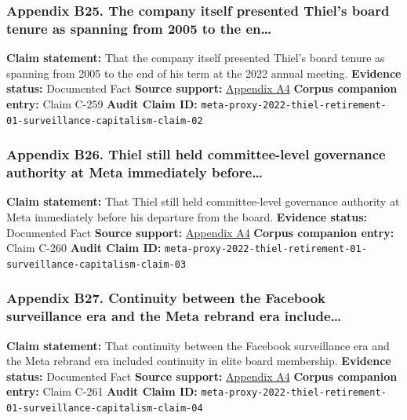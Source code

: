 \documentclass[
  american,
  11pt,
  letterpaper,
]{article}
\begin{document}
\subsubsection{Appendix B25. The company itself presented Thiel's board
tenure as spanning from 2005 to the
en\ldots{}}\label{ch-01-appendix-b25-the-company-itself-presented-thiel-s-board-tenure-as-spanning-from-2005-to-the-en}

\textbf{Claim statement:} That the company itself presented Thiel's
board tenure as spanning from 2005 to the end of his term at the 2022
annual meeting. \textbf{Evidence status:} Documented Fact \textbf{Source
support:}
\hyperref[ch-01-appendix-a4-meta-platforms-inc-2022-definitive-proxy-statement]{Appendix
A4} \textbf{Corpus companion entry:} Claim C-259 \textbf{Audit Claim
ID:}
\texttt{meta-proxy-2022-thiel-retirement-01-surveillance-capitalism-claim-02}

\subsubsection{Appendix B26. Thiel still held committee-level governance
authority at Meta immediately
before\ldots{}}\label{ch-01-appendix-b26-thiel-still-held-committee-level-governance-authority-at-meta-immediately-before}

\textbf{Claim statement:} That Thiel still held committee-level
governance authority at Meta immediately before his departure from the
board. \textbf{Evidence status:} Documented Fact \textbf{Source
support:}
\hyperref[ch-01-appendix-a4-meta-platforms-inc-2022-definitive-proxy-statement]{Appendix
A4} \textbf{Corpus companion entry:} Claim C-260 \textbf{Audit Claim
ID:}
\texttt{meta-proxy-2022-thiel-retirement-01-surveillance-capitalism-claim-03}

\subsubsection{Appendix B27. Continuity between the Facebook
surveillance era and the Meta rebrand era
include\ldots{}}\label{ch-01-appendix-b27-continuity-between-the-facebook-surveillance-era-and-the-meta-rebrand-era-include}

\textbf{Claim statement:} That continuity between the Facebook
surveillance era and the Meta rebrand era included continuity in elite
board membership. \textbf{Evidence status:} Documented Fact
\textbf{Source support:}
\hyperref[ch-01-appendix-a4-meta-platforms-inc-2022-definitive-proxy-statement]{Appendix
A4} \textbf{Corpus companion entry:} Claim C-261 \textbf{Audit Claim
ID:}
\texttt{meta-proxy-2022-thiel-retirement-01-surveillance-capitalism-claim-04}
\end{document}
